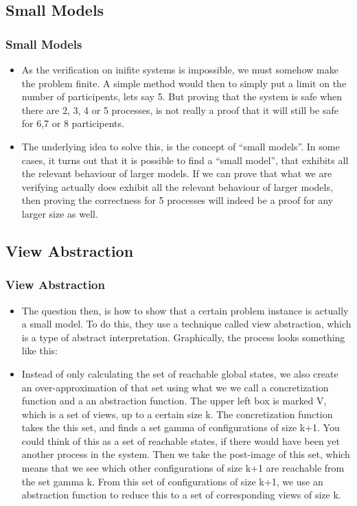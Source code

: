 \documentclass[handout]{beamer}
\begin{document}
\begin{footnotesize}
\begin{frame}
\begin{itemize}
\end{itemize}
\end{frame}


\subsection{Small Models}
\begin{frame}
  \frametitle{Small Models}
  \begin{itemize}
  \item
As the verification on inifite systems is impossible, we must somehow make the problem finite. A simple method would then to simply put a limit on the number of participents, lets say 5. But proving that the system is safe when there are 2, 3, 4 or 5 processes, is not really a proof that it will still be safe for 6,7 or 8 participents.
\item
    The underlying idea to solve this, is the concept of ``small models''. In some cases, it turns out that it is possible to find a ``small model'', that exhibits all the relevant behaviour of larger models. If we can prove that what we are verifying actually does exhibit all the relevant behaviour of larger models, then proving the correctness for 5 processes will indeed be a proof for any larger size as well.

  \end{itemize}
\end{frame}

\subsection{View Abstraction}
\begin{frame}
\frametitle{View Abstraction} %

\begin{itemize}
\item
The question then, is how to show that a certain problem instance is actually a small model. To do this, they use a technique called view abstraction, which is a type of abstract interpretation. Graphically, the process looks something like this:
\item
Instead of only calculating the set of reachable global states, we also create an over-approximation of that set using what we we call a concretization function and a an abstraction function. The upper left box is marked V, which is a set of views, up to a certain size k. The concretization function takes the this set, and finds a set gamma of configurations of size k+1. You could think of this as a set of reachable states, if there would have been yet another process in the system. Then we take the post-image of this set, which means that we see which other configurations of size k+1 are reachable from the set gamma k. From this set of configurations of size k+1, we use an abstraction function to reduce this to a set of corresponding views of size k.
\end{itemize}
\end{frame}


\end{footnotesize}
\end{document}

